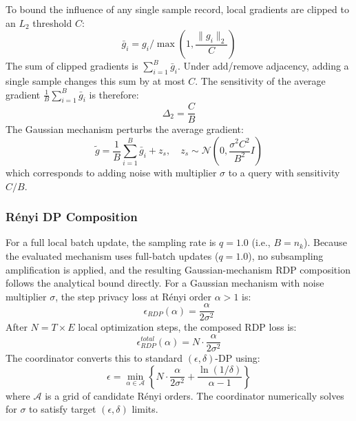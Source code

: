 \documentclass[conference]{IEEEtran}
\begin{document}
To bound the influence of any single sample record, local gradients are clipped to an $L_2$ threshold $C$:
\begin{equation}
\bar{g}_i = g_i / \max\left(1, \frac{\|g_i\|_2}{C}\right)
\end{equation}
The sum of clipped gradients is $\sum_{i=1}^B \bar{g}_i$. Under add/remove adjacency, adding a single sample changes this sum by at most $C$. The sensitivity of the average gradient $\frac{1}{B} \sum_{i=1}^B \bar{g}_i$ is therefore:
\begin{equation}
\Delta_2 = \frac{C}{B}
\end{equation}
The Gaussian mechanism perturbs the average gradient:
\begin{equation}
\tilde{g} = \frac{1}{B} \sum_{i=1}^B \bar{g}_i + z_s, \quad z_s \sim \mathcal{N}\left(0, \frac{\sigma^2 C^2}{B^2} I\right)
\end{equation}
which corresponds to adding noise with multiplier $\sigma$ to a query with sensitivity $C/B$.

\subsubsection{Rényi DP Composition}
For a full local batch update, the sampling rate is $q=1.0$ (i.e., $B = n_k$). Because the evaluated mechanism uses full-batch updates ($q=1.0$), no subsampling amplification is applied, and the resulting Gaussian-mechanism RDP composition follows the analytical bound directly. For a Gaussian mechanism with noise multiplier $\sigma$, the step privacy loss at Rényi order $\alpha > 1$ is:
\begin{equation}
\epsilon_{RDP}(\alpha) = \frac{\alpha}{2 \sigma^2}
\end{equation}
After $N = T \times E$ local optimization steps, the composed RDP loss is:
\begin{equation}
\epsilon_{RDP}^{total}(\alpha) = N \cdot \frac{\alpha}{2 \sigma^2}
\end{equation}
The coordinator converts this to standard $(\epsilon, \delta)$-DP using:
\begin{equation}
\epsilon = \min_{\alpha \in \mathcal{A}} \left\{ N \cdot \frac{\alpha}{2 \sigma^2} + \frac{\ln(1/\delta)}{\alpha - 1} \right\}
\end{equation}
where $\mathcal{A}$ is a grid of candidate Rényi orders. The coordinator numerically solves for $\sigma$ to satisfy target $(\epsilon, \delta)$ limits.
\end{document}
